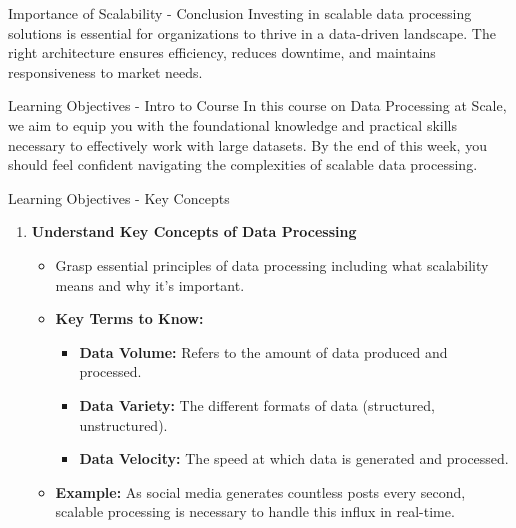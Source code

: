 \documentclass[aspectratio=169]{beamer}
\begin{document}
\begin{frame}[fragile]{Importance of Scalability - Conclusion}
    Investing in scalable data processing solutions is essential for organizations to thrive in a data-driven landscape. The right architecture ensures efficiency, reduces downtime, and maintains responsiveness to market needs.
\end{frame}

\begin{frame}[fragile]{Learning Objectives - Intro to Course}
    In this course on Data Processing at Scale, we aim to equip you with the foundational knowledge and practical skills necessary to effectively work with large datasets. By the end of this week, you should feel confident navigating the complexities of scalable data processing.
\end{frame}

\begin{frame}[fragile]{Learning Objectives - Key Concepts}
    \begin{enumerate}
        \item \textbf{Understand Key Concepts of Data Processing}
        \begin{itemize}
            \item Grasp essential principles of data processing including what scalability means and why it's important.
            \item \textbf{Key Terms to Know:}
            \begin{itemize}
                \item \textbf{Data Volume:} Refers to the amount of data produced and processed.
                \item \textbf{Data Variety:} The different formats of data (structured, unstructured).
                \item \textbf{Data Velocity:} The speed at which data is generated and processed.
            \end{itemize}
            \item \textbf{Example:} As social media generates countless posts every second, scalable processing is necessary to handle this influx in real-time.
        \end{itemize}
    \end{enumerate}
\end{frame}
\end{document}

